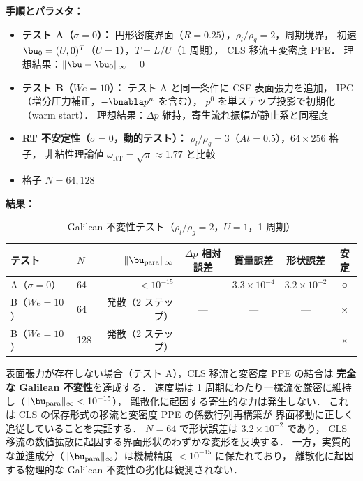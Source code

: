 \noindent\textbf{手順とパラメタ：}
\begin{itemize}[noitemsep]
  \item \textbf{テスト A（$\sigma = 0$）：}
        円形密度界面（$R = 0.25$），$\rho_l/\rho_g = 2$，周期境界，
        初速 $\bu_0 = (U, 0)^T$（$U = 1$），$T = L/U$（1 周期），
        CLS 移流＋変密度 PPE．
        理想結果：$\|\bu - \bu_0\|_\infty = 0$
  \item \textbf{テスト B（$\mathit{We} = 10$）：}
        テスト A と同一条件に CSF 表面張力を追加，
        IPC（増分圧力補正，$-\bnabla p^n$ を含む），
        $p^0$ を単ステップ投影で初期化（warm start）．
        理想結果：$\Delta p$ 維持，寄生流れ振幅が静止系と同程度
  \item \textbf{RT 不安定性（$\sigma = 0$，動的テスト）：}
        $\rho_l/\rho_g = 3$（$At = 0.5$），$64 \times 256$ 格子，
        非粘性理論値 $\omega_{\mathrm{RT}} = \sqrt{\pi} \approx 1.77$ と比較
  \item 格子 $N = 64, 128$
\end{itemize}

\noindent\textbf{結果：}

\begin{table}[htbp]
\centering
\caption{Galilean 不変性テスト（$\rho_l/\rho_g = 2$，$U = 1$，1 周期）}
\label{tab:galilean}
\renewcommand{\arraystretch}{1.3}
\begin{tabular}{llrcccc}
\toprule
テスト & $N$ & $\|\bu_{\mathrm{para}}\|_\infty$ &
$\Delta p$ 相対誤差 & 質量誤差 & 形状誤差 & 安定 \\
\midrule
A（$\sigma{=}0$） &  64 & $< 10^{-15}$ & --- & $3.3 \times 10^{-4}$ & $3.2 \times 10^{-2}$ & ○ \\
\midrule
B（$\mathit{We}{=}10$）  &  64 & 発散（2 ステップ） & --- & --- & --- & × \\
B（$\mathit{We}{=}10$）  & 128 & 発散（2 ステップ） & --- & --- & --- & × \\
\bottomrule
\end{tabular}
\end{table}

表面張力が存在しない場合（テスト A），CLS 移流と変密度 PPE の結合は
\textbf{完全な Galilean 不変性}を達成する．
速度場は 1 周期にわたり一様流を厳密に維持し（$\|\bu_{\mathrm{para}}\|_\infty < 10^{-15}$），
離散化に起因する寄生的な力は発生しない．
これは CLS の保存形式の移流と変密度 PPE の係数行列再構築が
界面移動に正しく追従していることを実証する．
$N = 64$ で形状誤差は $3.2 \times 10^{-2}$ であり，
CLS 移流の数値拡散に起因する界面形状のわずかな変形を反映する．
一方，実質的な並進成分（$\|\bu_{\mathrm{para}}\|_\infty$）は機械精度 $< 10^{-15}$ に保たれており，
離散化に起因する物理的な Galilean 不変性の劣化は観測されない．

